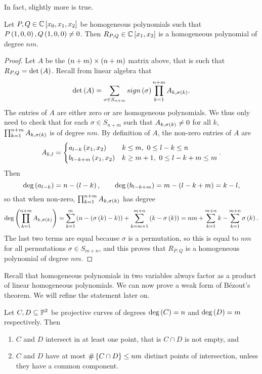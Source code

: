In fact, slightly more is true.

\begin{theorem}
\label{thm:9.7}
Let $ P, Q \in \C\sb{x_0, x_1, x_2} $ be homogeneous polynomials such that $ P\rb{1, 0, 0}, Q\rb{1, 0, 0} \ne 0 $. Then $ R_{P, Q} \in \C\sb{x_1, x_2} $ is a homogeneous polynomial of degree $ nm $.
\end{theorem}

\begin{proof}
Let $ A $ be the $ \rb{n + m} \times \rb{n + m} $ matrix above, that is such that $ R_{P, Q} = \det\rb{A} $. Recall from linear algebra that
$$ \det\rb{A} = \sum_{\sigma \in S_{n + m}} sign\rb{\sigma}\prod_{k = 1}^{n + m}A_{k, \sigma\rb{k}}. $$
The entries of $ A $ are either zero or are homogeneous polynomials. We thus only need to check that for each $ \sigma \in S_{n + m} $ such that $ A_{k, \sigma\rb{k}} \ne 0 $ for all $ k $, $ \prod_{k = 1}^{n + m} A_{k, \sigma\rb{k}} $ is of degree $ nm $. By definition of $ A $, the non-zero entries of $ A $ are
$$ A_{k, l} =
\begin{cases}
a_{l - k}\rb{x_1, x_2} & k \le m, \ 0 \le l - k \le n \\
b_{l - k + m}\rb{x_1, x_2} & k \ge m + 1, \ 0 \le l - k + m \le m
\end{cases}.
$$
Then
$$ \deg\rb{a_{l - k}} = n - \rb{l - k}, \qquad \deg\rb{b_{l - k + m}} = m - \rb{l - k + m} = k - l, $$
so that when non-zero, $ \prod_{k = 1}^{n + m} A_{k, \sigma\rb{k}} $ has degree
$$ \deg\rb{\prod_{k = 1}^{n + m} A_{k, \sigma\rb{k}}} = \sum_{k = 1}^m \rb{n - \rb{\sigma\rb{k} - k}} + \sum_{k = m + 1}^{m + n} \rb{k - \sigma\rb{k}} = nm + \sum_{k = 1}^{m + n} k - \sum_{k = 1}^{m + n} \sigma\rb{k}. $$
The last two terms are equal because $ \sigma $ is a permutation, so this is equal to $ nm $ for all permutations $ \sigma \in S_{m + n} $, and this proves that $ R_{P, Q} $ is a homogeneous polynomial of degree $ nm $.
\end{proof}

\pagebreak

Recall that homogeneous polynomials in two variables always factor as a product of linear homogeneous polynomials. We can now prove a weak form of B\'ezout's theorem. We will refine the statement later on.

\begin{theorem}
\label{thm:9.8}
Let $ C, D \subseteq \P^2 $ be projective curves of degrees $ \deg\rb{C} = n $ and $ \deg\rb{D} = m $ respectively. Then
\begin{enumerate}
\item $ C $ and $ D $ intersect in at least one point, that is $ C \cap D $ is not empty, and
\item $ C $ and $ D $ have at most $ \#\cb{C \cap D} \le nm $ distinct points of intersection, unless they have a common component.
\end{enumerate}
\end{theorem}


